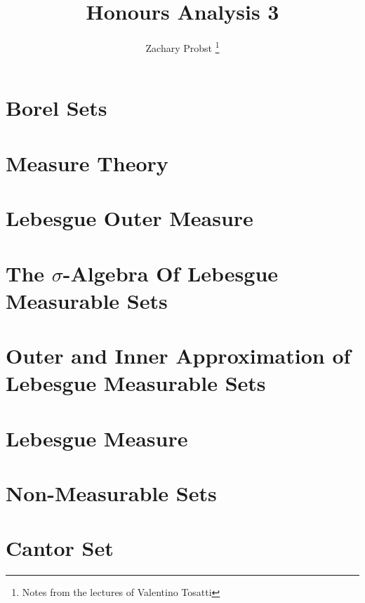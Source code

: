 \documentclass[11pt]{article}
\title{Honours Analysis 3}
\author{Zachary Probst \thanks{Notes from the lectures of Valentino Tosatti}}
\begin{document}
    \maketitle


    \section{Borel Sets}\label{sec:borel-sets}
    


    \section{Measure Theory}\label{sec:measure-theory}
    


    \section{Lebesgue Outer Measure}\label{sec:lebesgue-outer-measure}
    


    \section{The $\sigma$-Algebra Of Lebesgue Measurable Sets}\label{sec:the-$sigma$-algebra-of-lebesgue-measurable-sets}
    


    \section{Outer and Inner Approximation of Lebesgue Measurable Sets}\label{sec:outer-and-inner-approximation-of-lebesgue-measureable-sets}
    


    \section{Lebesgue Measure}\label{sec:lebesgue-measure}
    


    \section{Non-Measurable Sets}\label{sec:non-measurable-sets}
    

    \section{Cantor Set}\label{sec:cantor-set}
    
    
\end{document}
